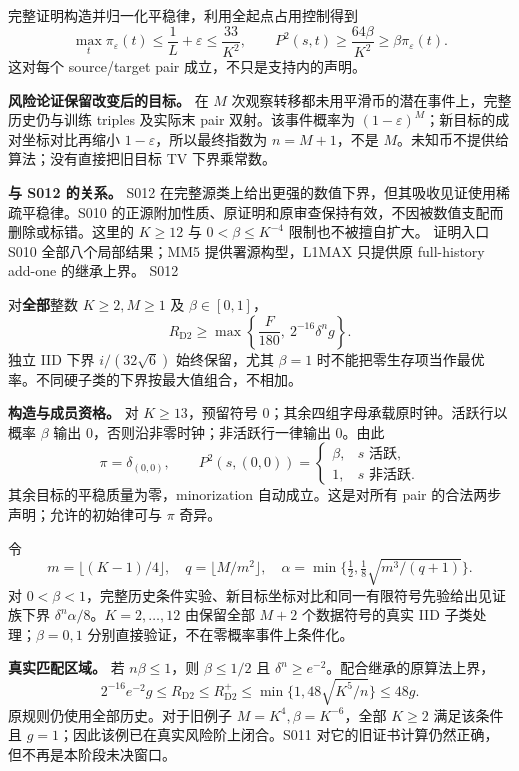 \documentclass[11pt,a4paper]{article}
\newcommand{\R}{R_{\mathrm{D2}}}\newcommand{\Rp}{R_{\mathrm{D2}}^{+}}
\newcommand{\dd}{\delta}
\newcommand{\head}[2]{{\small\sffamily #1}\par\vspace{2pt}{\LARGE\bfseries #2}\par\vspace{5pt}}
\newcommand{\entry}[1]{\vfill\noindent\small 证明入口\quad #1\normalsize}
\begin{document}
完整证明构造并归一化平稳律，利用全起点占用控制得到
\[
 \max_t\pi_\varepsilon(t)\le\frac1L+\varepsilon\le\frac{33}{K^2},
 \qquad P^2(s,t)\ge\frac{64\beta}{K^2}\ge\beta\pi_\varepsilon(t).
\]
这对每个 source/target pair 成立，不只是支持内的声明。

\textbf{风险论证保留改变后的目标。} 在 $M$ 次观察转移都未用平滑币的潜在事件上，完整历史仍与训练 triples 及实际末 pair 双射。该事件概率为 $(1-\varepsilon)^M$；新目标的成对坐标对比再缩小 $1-\varepsilon$，所以最终指数为 $n=M+1$，不是 $M$。未知币不提供给算法；没有直接把旧目标 TV 下界乘常数。

\textbf{与 S012 的关系。} S012 在完整源类上给出更强的数值下界，但其吸收见证使用稀疏平稳律。S010 的正源附加性质、原证明和原审查保持有效，不因被数值支配而删除或标错。这里的 $K\ge12$ 与 $0<\beta\le K^{-4}$ 限制也不被擅自扩大。
\entry{S010 全部八个局部结果；MM5 提供署源构型，L1MAX 只提供原 full-history add-one 的继承上界。}
\newpage
\head{S012}{允许稀疏平稳律后得到更强下界}
对\textbf{全部}整数 $K\ge2,M\ge1$ 及 $\beta\in[0,1]$，
\[
 \R\ge\max\!\left\{\frac{F}{180},\ 2^{-16}\dd^n g\right\}.
\]
独立 IID 下界 $i/(32\sqrt6)$ 始终保留，尤其 $\beta=1$ 时不能把零生存项当作最优率。不同硬子类的下界按最大值组合，不相加。

\textbf{构造与成员资格。} 对 $K\ge13$，预留符号 $0$；其余四组字母承载原时钟。活跃行以概率 $\beta$ 输出 $0$，否则沿非零时钟；非活跃行一律输出 $0$。由此
\[
 \pi=\delta_{(0,0)},\qquad
 P^2(s,(0,0))=
 \begin{cases}\beta,&s\text{ 活跃},\\1,&s\text{ 非活跃}.\end{cases}
\]
其余目标的平稳质量为零，minorization 自动成立。这是对所有 pair 的合法两步声明；允许的初始律可与 $\pi$ 奇异。

令
\[
 m=\lfloor(K-1)/4\rfloor,\quad q=\lfloor M/m^2\rfloor,\quad
 \alpha=\min\{\tfrac12,\tfrac18\sqrt{m^3/(q+1)}\}.
\]
对 $0<\beta<1$，完整历史条件实验、新目标坐标对比和同一有限符号先验给出见证族下界 $\dd^n\alpha/8$。$K=2,\ldots,12$ 由保留全部 $M+2$ 个数据符号的真实 IID 子类处理；$\beta=0,1$ 分别直接验证，不在零概率事件上条件化。

\textbf{真实匹配区域。} 若 $n\beta\le1$，则 $\beta\le1/2$ 且
$\dd^n\ge e^{-2}$。配合继承的原算法上界，
\[
 2^{-16}e^{-2}g\le\R\le\Rp
 \le\min\{1,48\sqrt{K^5/n}\}\le48g.
\]
原规则仍使用全部历史。对于旧例子 $M=K^4,\beta=K^{-6}$，全部 $K\ge2$ 满足该条件且 $g=1$；因此该例已在真实风险阶上闭合。S011 对它的旧证书计算仍然正确，但不再是本阶段未决窗口。
\end{document}
